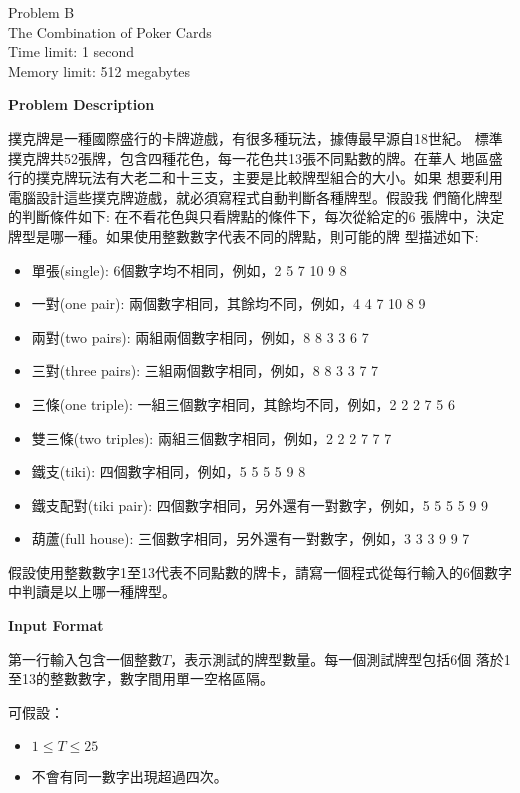 \begin{center}
    {\LARGE Problem B}\vspace{1mm}\\
    {\Large The Combination of Poker Cards}\\
    {Time limit: 1 second}\\
    {Memory limit: 512 megabytes}
\end{center}

\textbf{\large Problem Description}

撲克牌是一種國際盛行的卡牌遊戲，有很多種玩法，據傳最早源自18世紀。
標準撲克牌共52張牌，包含四種花色，每一花色共13張不同點數的牌。在華人
地區盛行的撲克牌玩法有大老二和十三支，主要是比較牌型組合的大小。如果
想要利用電腦設計這些撲克牌遊戲，就必須寫程式自動判斷各種牌型。假設我
們簡化牌型的判斷條件如下: 在不看花色與只看牌點的條件下，每次從給定的6
張牌中，決定牌型是哪一種。如果使用整數數字代表不同的牌點，則可能的牌
型描述如下:
\begin{itemize}
\item 單張(single): 6個數字均不相同，例如，2 5 7 10 9 8
\item 一對(one pair): 兩個數字相同，其餘均不同，例如，4 4 7 10 8 9
\item 兩對(two pairs): 兩組兩個數字相同，例如，8 8 3 3 6 7
\item 三對(three pairs): 三組兩個數字相同，例如，8 8 3 3 7 7
\item 三條(one triple): 一組三個數字相同，其餘均不同，例如，2 2 2 7 5 6
\item 雙三條(two triples): 兩組三個數字相同，例如，2 2 2 7 7 7
\item 鐵支(tiki): 四個數字相同，例如，5 5 5 5 9 8
\item 鐵支配對(tiki pair): 四個數字相同，另外還有一對數字，例如，5 5 5 5 9
9
\item 葫蘆(full house): 三個數字相同，另外還有一對數字，例如，3 3 3 9 9 7
\end{itemize}
假設使用整數數字1至13代表不同點數的牌卡，請寫一個程式從每行輸入的6個數字中判讀是以上哪一種牌型。

\textbf{\large Input Format}

第一行輸入包含一個整數$T$，表示測試的牌型數量。每一個測試牌型包括6個
落於1至13的整數數字，數字間用單一空格區隔。

可假設：
\begin{itemize}
    \tightlist{}
    \item $1 \le T \le 25$
    \item 不會有同一數字出現超過四次。
\end{itemize}

